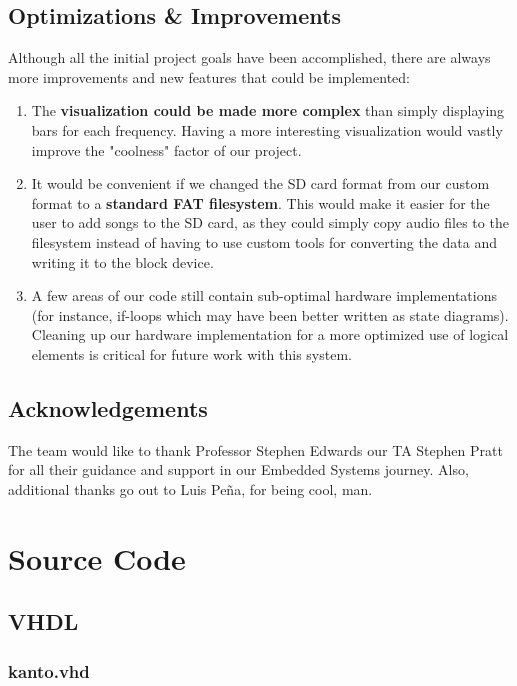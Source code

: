 \documentclass{article}
\begin{document}
\subsection{Optimizations \& Improvements}

Although all the initial project goals have been accomplished, there are always 
more improvements and new features that could be implemented: 
\begin{enumerate}
	\item The \textbf{visualization could be made more complex} than simply 
	displaying bars for each frequency. Having a more interesting visualization 
	would vastly improve the "coolness" factor of our project.
	\item It would be convenient if we changed the SD card format from our custom 
	format to a \textbf{standard FAT filesystem}. This would make it easier for the 
	user to add songs to the SD card, as they could simply copy audio files to the 
	filesystem instead of having to use custom tools for converting the data and 
	writing it to the block device.
	\item A few areas of our code still contain sub-optimal hardware
	implementations (for instance, if-loops which may have been better written
	as state diagrams). Cleaning up our hardware implementation for a more
	optimized use of logical elements is critical for future work with this system.
\end{enumerate}

\subsection{Acknowledgements}
The team would like to thank Professor Stephen Edwards our TA Stephen Pratt for
all their guidance and support in our Embedded Systems journey. Also,
additional thanks go out to Luis Pe\~{n}a, for being cool, man.

\newpage
\appendix

\section{Source Code}
\subsection{VHDL}
	\subsubsection{kanto.vhd}
	
\end{document}
